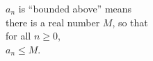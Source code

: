 \documentclass[border=6pt]{standalone}
\begin{document}
\parbox{1.8in}{$a_n$ is ``bounded above'' means \\
\null\quad there is a real number $M$, so that \\
\null\quad for all $n \geq 0$, \\
\null\quad $a_n \leq M$.
}
\end{document}
